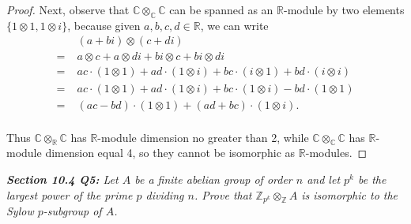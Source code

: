 \documentclass{article}
\begin{document}
\begin{proof}
    Next, observe that $\mathbb{C}\otimes_\mathbb{C}\mathbb{C}$ can be
    spanned as an $\mathbb{R}$-module by two elements
    $\{1\otimes1,1\otimes i\}$, because given $a,b,c,d\in\mathbb{R}$, we can
    write
    \begin{align*}
      &\;(a+bi)\otimes(c+di)\\
      =&\;a\otimes c+a\otimes di +bi\otimes c +bi\otimes di\\
      =&\;ac\cdot(1\otimes1) +ad\cdot(1\otimes i) +bc\cdot(i\otimes1)
        +bd\cdot(i\otimes i)\\
      =&\;ac\cdot(1\otimes1) +ad\cdot(1\otimes i) +bc\cdot(1\otimes i)
        -bd\cdot(1\otimes1)\\
      =&\;(ac-bd)\cdot(1\otimes1) +(ad+bc)\cdot(1\otimes i).\\
    \end{align*}

    Thus $\mathbb{C}\otimes_\mathbb{R}\mathbb{C}$ has $\mathbb{R}$-module
    dimension no greater than 2, while
    $\mathbb{C}\otimes_\mathbb{C}\mathbb{C}$ has $\mathbb{R}$-module
    dimension equal 4, so they cannot be isomorphic as
    $\mathbb{R}$-modules.
  \end{proof}

\it \textbf{Section 10.4 Q5:} Let $A$ be a finite abelian group of order
  $n$ and let $p^k$ be the largest power of the prime $p$ dividing $n$.
  Prove that $\mathbb{Z}_{p^k}\otimes_\mathbb{Z}A$ is isomorphic to
  the Sylow $p$-subgroup of $A$.
\end{document}
